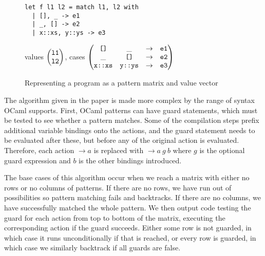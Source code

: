 \begin{figure}[H]
\begin{minipage}{0.45\textwidth}
\begin{verbatim}
let f l1 l2 = match l1, l2 with
  | [], _ -> e1
  | _, [] -> e2
  | x::xs, y::ys -> e3
\end{verbatim}
\end{minipage}
\begin{minipage}{0.55\textwidth}
 values $\begin{pmatrix}
\verb|l1| \\
\verb|l2|
\end{pmatrix}$, cases
$\begin{pmatrix}
\verb|[]| & \_ & \to & \verb|e1| \\
\_ & \verb|[]| & \to & \verb|e2| \\
\verb|x::xs| & \verb|y::ys| & \to & \verb|e3| \\
\end{pmatrix}$
\end{minipage}
\caption{Representing a program as a pattern matrix and value vector}
\end{figure}

The algorithm given in the paper is made more complex by the range of syntax OCaml supports. %
First, OCaml patterns can have guard statements, which must be tested to see whether a pattern matches. Some of the compilation steps prefix additional variable bindings onto the actions, and the guard statement needs to be evaluated after these, but before any of the original action is evaluated. Therefore, each action $\to a$ is replaced with $\to a \ g \ b$ where $g$ is the optional guard expression and $b$ is the other bindings introduced.

The base cases of this algorithm occur when we reach a matrix with either no rows or no columns of patterns. If there are no rows, we have run out of possibilities so pattern matching fails and backtracks. If there are no columns, we have successfully matched the whole pattern. We then output code testing the guard for each action from top to bottom of the matrix, executing the corresponding action if the guard succeeds. Either some row is not guarded, in which case it runs unconditionally if that is reached, or every row is guarded, in which case we similarly backtrack if all guards are false.

